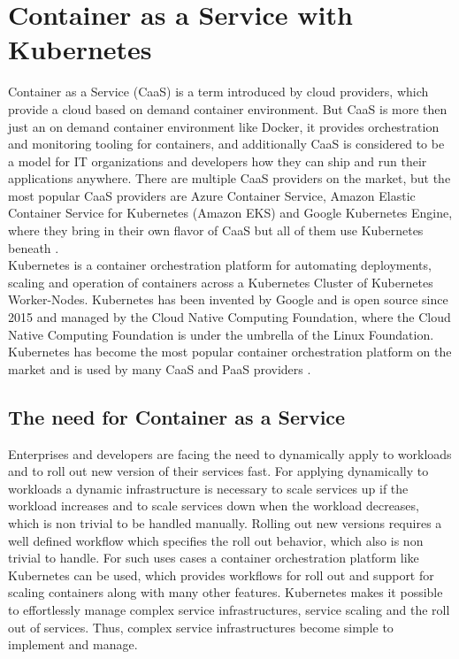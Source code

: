 \chapter{Container as a Service with Kubernetes}
\label{cha:caas}
Container as a Service (CaaS) is a term introduced by cloud providers, which provide a cloud based on demand container environment. But CaaS is more then just an on demand container environment like Docker, it provides orchestration and monitoring tooling for containers, and additionally CaaS is considered to be a model for IT organizations and developers how they can ship and run their applications anywhere. There are multiple CaaS providers on the market, but the most popular CaaS providers are Azure Container Service, Amazon Elastic Container Service for Kubernetes (Amazon EKS) and Google Kubernetes Engine, where they bring in their own flavor of CaaS but all of them use Kubernetes beneath  \cite{CNCFKubernetes2018, MicrosoftAzureAKS2018, AmazonWebServicesEKS2018, GoogleCloudKE2018}. \\

Kubernetes is a container orchestration platform for automating deployments, scaling and operation of containers across a Kubernetes Cluster of Kubernetes Worker-Nodes. Kubernetes has been invented by Google and is open source since 2015 and managed by the Cloud Native Computing Foundation, where the Cloud Native Computing Foundation is under the umbrella of the Linux Foundation. Kubernetes has become the most popular container orchestration platform on the market and is used by many CaaS and PaaS providers \cite{CNCF2018}.

\section{The need for Container as a Service}
\label{sec:caas-need-for-caas}
Enterprises and developers are facing the need to dynamically apply to workloads and to roll out new version of their services fast. For applying dynamically to workloads a dynamic infrastructure is necessary to scale services up if the workload increases and to scale services down when the workload decreases, which is non trivial to be handled manually. Rolling out new versions requires a well defined workflow which specifies the roll out behavior, which also is non trivial to handle. For such uses cases a container orchestration platform like Kubernetes can be used, which provides workflows for roll out and support for scaling containers along with many other features. Kubernetes makes it possible to effortlessly manage complex service infrastructures, service scaling and the roll out of services. Thus, complex service infrastructures become simple to implement and manage. \\

